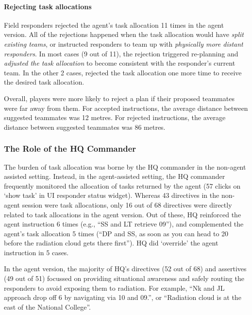 \paragraph{Rejecting task allocations}
\noindent Field responders rejected the agent's task allocation 11 times in the agent version. All of the rejections happened when the task allocation would have \emph{split existing teams}, or instructed responders to team up with \emph{physically more distant responders}. In most cases (9 out of 11), the rejection triggered re-planning and \emph{adjusted the task allocation} to become consistent with the responder's current team. In the other 2 cases, rejected the task allocation one more time to receive the desired task allocation. 

Overall, players were more likely to reject a plan if their proposed teammates were far away from them. For accepted instructions, the average distance between suggested teammates was 12 metres. For rejected instructions, the average distance between suggested teammates was 86 metres.

\subsubsection{The Role of the HQ Commander}
\noindent The burden of task allocation was borne by the HQ commander in the non-agent assisted setting. Instead, in the agent-assisted setting, the HQ commander frequently monitored the allocation of tasks  returned by the agent (57 clicks on `show task' in UI responder status widget). Whereas 43 directives in the non-agent session were task allocations, only 16 out of 68 directives were directly related to task allocations in the agent version. Out of these, HQ reinforced the agent instruction 6 times (e.g., ``SS and LT retrieve 09''), and complemented the agent's task allocation 5 times (``DP and SS, as soon as you can head to 20 before the radiation cloud gets there first''). HQ did `override' the agent instruction in 5 cases.  

In the agent version, the majority of HQ's directives (52 out of 68) and assertives (49 out of 51) focussed on providing situational awareness and safely routing the responders to avoid exposing them to radiation. For example, ``Nk and JL approach drop off 6 by navigating via 10 and 09.'', or ``Radiation cloud is at the east of the National College''. 


